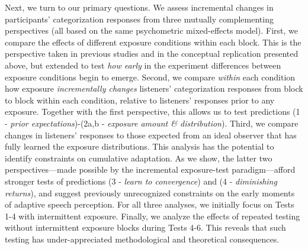 \documentclass[
  11pt,
  man,mask,floatsintext]{apa6}
\begin{document}
Next, we turn to our primary questions. We assess incremental changes in participants' categorization responses from three mutually complementing perspectives (all based on the same psychometric mixed-effects model). First, we compare the effects of different exposure conditions within each block. This is the perspective taken in previous studies and in the conceptual replication presented above, but extended to test \emph{how early} in the experiment differences between exposure conditions begin to emerge. Second, we compare \emph{within} each condition how exposure \emph{incrementally changes} listeners' categorization responses from block to block within each condition, relative to listeners' responses prior to any exposure. Together with the first perspective, this allows us to test predictions (1 - \emph{prior expectations})-(2a,b - \emph{exposure amount \& distribution}). Third, we compare changes in listeners' responses to those expected from an ideal observer that has fully learned the exposure distributions. This analysis has the potential to identify constraints on cumulative adaptation. As we show, the latter two perspectives---made possible by the incremental exposure-test paradigm---afford stronger tests of predictions (3 - \emph{learn to convergence}) and (4 - \emph{diminishing returns}), and suggest previously unrecognized constraints on the early moments of adaptive speech perception. For all three analyses, we initially focus on Tests 1-4 with intermittent exposure. Finally, we analyze the effects of repeated testing without intermittent exposure blocks during Tests 4-6. This reveals that such testing has under-appreciated methodological and theoretical consequences.
\end{document}
